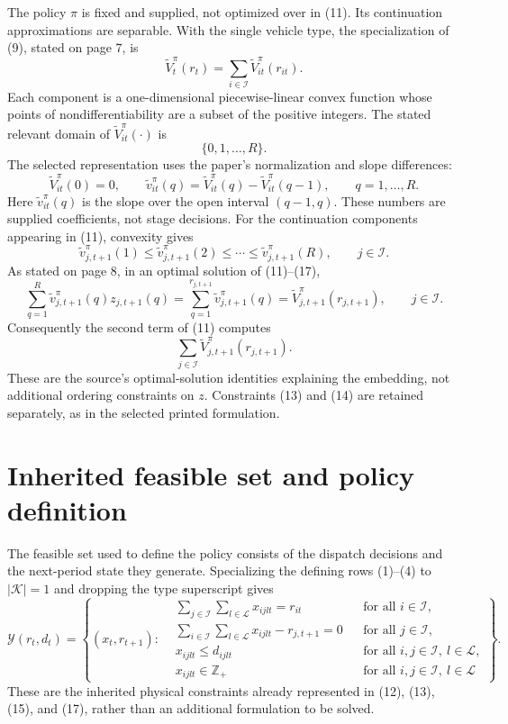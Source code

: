 \documentclass{article}
\begin{document}
The policy $\pi$ is fixed and supplied, not optimized over in (11). Its continuation approximations are separable. With the single vehicle type, the specialization of (9), stated on page 7, is
\begin{equation}
\tilde V^\pi_t(r_t)=\sum_{i\in\mathcal I}\tilde V^\pi_{it}(r_{it}).
\tag{9, single type}
\end{equation}
Each component is a one-dimensional piecewise-linear convex function whose points of nondifferentiability are a subset of the positive integers. The stated relevant domain of $\tilde V^\pi_{it}(\cdot)$ is
\[
\{0,1,\ldots,R\}.
\]
The selected representation uses the paper's normalization and slope differences:
\[
\tilde V^\pi_{it}(0)=0,\qquad
\tilde v^\pi_{it}(q)=\tilde V^\pi_{it}(q)-\tilde V^\pi_{it}(q-1),
\qquad q=1,\ldots,R.
\]
Here $\tilde v^\pi_{it}(q)$ is the slope over the open interval $(q-1,q)$. These numbers are supplied coefficients, not stage decisions. For the continuation components appearing in (11), convexity gives
\[
\tilde v^\pi_{j,t+1}(1)\leq\tilde v^\pi_{j,t+1}(2)
\leq\cdots\leq\tilde v^\pi_{j,t+1}(R),
\qquad j\in\mathcal I.
\]
As stated on page 8, in an optimal solution of (11)--(17),
\[
\sum_{q=1}^{R}\tilde v^\pi_{j,t+1}(q)z_{j,t+1}(q)
=\sum_{q=1}^{r_{j,t+1}}\tilde v^\pi_{j,t+1}(q)
=\tilde V^\pi_{j,t+1}(r_{j,t+1}),
\qquad j\in\mathcal I.
\]
Consequently the second term of (11) computes
\[
\sum_{j\in\mathcal I}\tilde V^\pi_{j,t+1}(r_{j,t+1}).
\]
These are the source's optimal-solution identities explaining the embedding, not additional ordering constraints on $z$. Constraints (13) and (14) are retained separately, as in the selected printed formulation.

\section*{Inherited feasible set and policy definition}

The feasible set used to define the policy consists of the dispatch decisions and the next-period state they generate. Specializing the defining rows (1)--(4) to $|\mathcal K|=1$ and dropping the type superscript gives
\begin{equation}
\mathcal Y(r_t,d_t)=
\left\{(x_t,r_{t+1}):
\begin{aligned}
&\sum_{j\in\mathcal I}\sum_{l\in\mathcal L}x_{ijlt}=r_{it}
&&\text{for all }i\in\mathcal I,\\
&\sum_{i\in\mathcal I}\sum_{l\in\mathcal L}x_{ijlt}-r_{j,t+1}=0
&&\text{for all }j\in\mathcal I,\\
&x_{ijlt}\leq d_{ijlt}
&&\text{for all }i,j\in\mathcal I,\ l\in\mathcal L,\\
&x_{ijlt}\in\mathbb Z_+
&&\text{for all }i,j\in\mathcal I,\ l\in\mathcal L
\end{aligned}
\right\}.
\tag{1--4, single type}
\end{equation}
These are the inherited physical constraints already represented in (12), (13), (15), and (17), rather than an additional formulation to be solved.
\end{document}
